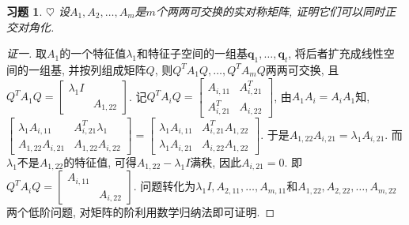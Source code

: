 \documentclass{ctexart}
\newtheorem{exercise}[thm]{习题}
\newcommand\bs[1]{\boldsymbol{ #1}}
\def\hard{$\heartsuit$}
\begin{document}
\begin{exercise} \hard
设$A_1, A_2, \dots, A_m$是$m$个两两可交换的实对称矩阵, 证明它们可以同时正交对角化. 
\end{exercise}
\begin{proof}[证一]
	取$A_1$的一个特征值$\lambda_1$和特征子空间的一组基$\bs q_1,\dots,\bs q_t$, 将后者扩充成线性空间的一组基, 并按列组成矩阵$Q$, 则$Q^TA_1Q,\dots,Q^TA_mQ$两两可交换, 且$Q^TA_1Q=\begin{bmatrix}
		\lambda_1I & \\ &  A_{1,22}
	\end{bmatrix}$. 记$Q^TA_iQ=\begin{bmatrix}
	A_{i,11} & A_{i,21}^T \\ A_{i,21}^T & A_{i,22}
	\end{bmatrix}$, 由$A_1A_i=A_iA_1$知, $\begin{bmatrix}
	\lambda_1A_{i,11} & A_{i,21}^T\lambda_1 \\  A_{1,22}A_{i,21} &  A_{1,22}A_{i,22}
	\end{bmatrix}=\begin{bmatrix}
	\lambda_1A_{i,11} & A_{i,21}^T A_{1,22} \\ \lambda_1A_{i,21} & A_{i,22} A_{1,22}
	\end{bmatrix}$. 
	于是$ A_{1,22}A_{i,21}=\lambda_1A_{i,21}$. 
	而$\lambda_1$不是$ A_{1,22}$的特征值, 可得$ A_{1,22}-\lambda_1I$满秩, 因此$A_{i,21}=0$. 
	即$Q^TA_iQ=\begin{bmatrix}
	A_{i,11} &  \\  & A_{i,22}
	\end{bmatrix}$. 
	问题转化为$\lambda_1I, A_{2,11},\dots,A_{m,11}$和$ A_{1,22},A_{2,22},\dots,A_{m,22}$两个低阶问题, 对矩阵的阶利用数学归纳法即可证明. 
\end{proof}
\end{document}
